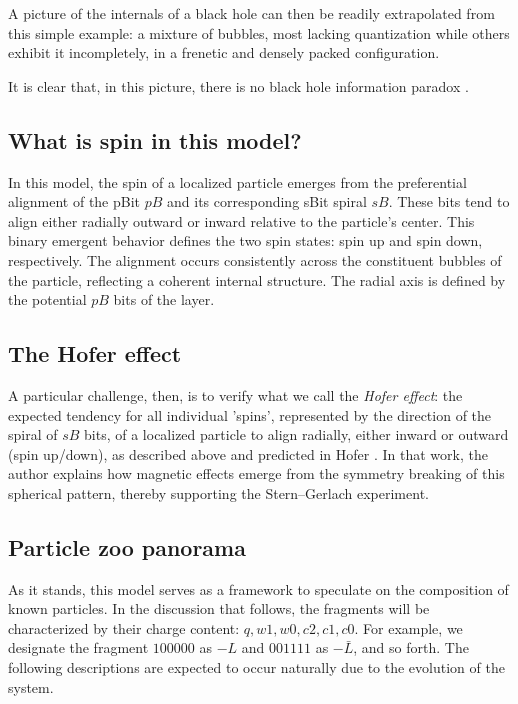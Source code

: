 \documentclass[12pt]{article}
\begin{document}
A picture of the internals of a black hole can then be readily extrapolated from this simple example: a mixture of bubbles, most lacking quantization while others exhibit it incompletely, in a frenetic and densely packed configuration.

It is clear that, in this picture, there is no black hole information paradox \cite{hawking1976breakdown,harlow2016jerusalem}.

\subsection{What is spin in this model?}
In this model, the spin of a localized particle emerges from the preferential alignment of the pBit \( pB \) and its corresponding sBit spiral \( sB \). These bits tend to align either radially outward or inward relative to the particle’s center. This binary emergent behavior defines the two spin states: spin up and spin down, respectively. The alignment occurs consistently across the constituent bubbles of the particle, reflecting a coherent internal structure. The radial axis is defined by the potential $pB$ bits of the layer.

\subsection{The Hofer effect}

A particular challenge, then, is to verify what we call the \emph{Hofer effect}: the expected tendency for all individual 'spins', represented by the direction of the spiral of $sB$ bits, of a localized particle to align radially, either inward or outward (spin up/down), as described above and predicted in Hofer \cite{hofer}. In that work, the author explains how magnetic effects emerge from the symmetry breaking of this spherical pattern, thereby supporting the Stern–Gerlach experiment.

\subsection{Particle zoo panorama}
As it stands, this model serves as a framework to speculate on the composition of known particles. In the discussion that follows, the fragments will be characterized by their charge content: \(q, w1, w0, c2, c1, c0\). For example, we designate the fragment \(100000\) as \(-L\) and \(001111\) as \(-\bar{L}\), and so forth. The following descriptions are expected to occur naturally due to the evolution of the system.
\end{document}
